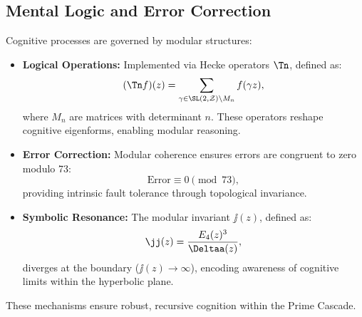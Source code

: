 \documentclass[12pt]{article}
\newcommand{\ZZ}{\mathcal{Z}}
\begin{document}
\subsection{Mental Logic and Error Correction}
Cognitive processes are governed by modular structures:
\begin{itemize}
    \item \textbf{Logical Operations:} Implemented via Hecke operators $\Tn$, defined as:
    \[
    (\Tn f)(z) = \sum_{\gamma \in \SL(2,\ZZ) \backslash M_n} f(\gamma z),
    \]
    where $M_n$ are matrices with determinant $n$. These operators reshape cognitive eigenforms, enabling modular reasoning.
    \item \textbf{Error Correction:} Modular coherence ensures errors are congruent to zero modulo 73:
    \[
    \text{Error} \equiv 0 \pmod{73},
    \]
    providing intrinsic fault tolerance through topological invariance.
    \item \textbf{Symbolic Resonance:} The modular invariant $\jj(z)$, defined as:
    \[
    \jj(z) = \frac{E_4(z)^3}{\Deltaa(z)},
    \]
    diverges at the boundary ($\jj(z) \to \infty$), encoding awareness of cognitive limits within the hyperbolic plane.
\end{itemize}
These mechanisms ensure robust, recursive cognition within the Prime Cascade.

\end{document}
